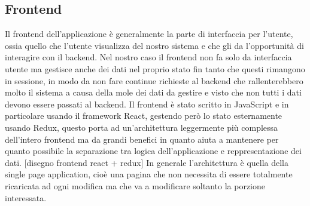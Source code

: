 \subsection*{Frontend}
Il frontend dell'applicazione è generalmente la parte di interfaccia per l'utente, ossia quello che l'utente visualizza del nostro sistema e che gli da l'opportunità di interagire con il backend. Nel nostro caso il frontend
non fa solo da interfaccia utente ma gestisce anche dei dati nel proprio stato fin tanto che questi rimangono in sessione, in modo da non fare continue richieste al backend che rallenterebbero molto il sistema a causa della mole dei dati da gestire e visto che non tutti i dati devono essere passati al backend.
Il frontend è stato scritto in JavaScript e in particolare usando il framework React, gestendo però lo stato esternamente usando Redux, questo porta ad un'architettura leggermente più complessa dell'intero frontend ma da grandi benefici in quanto aiuta a mantenere per quanto possibile la separazione tra logica dell'applicazione
e reppresentazione dei dati.
  [disegno frontend react + redux]
In generale l'architettura è quella della single page application, cioè una pagina che non necessita di essere totalmente ricaricata ad ogni modifica ma che va a modificare soltanto la porzione interessata.
